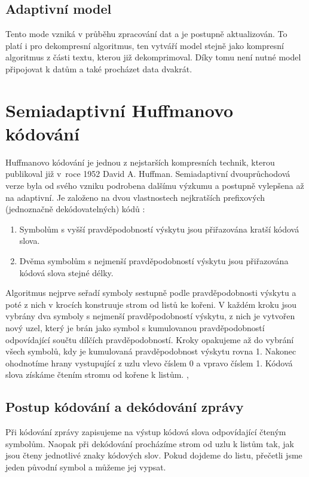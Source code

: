 \subsection{Adaptivní model}
Tento mode vzniká v průběhu zpracování dat a je postupně aktualizován. To platí i pro dekompresní algoritmus, ten vytváří model stejně jako kompresní algoritmus z části textu, kterou již dekomprimoval. Díky tomu není nutné model připojovat k datům a také procházet data dvakrát.

\section{Semiadaptivní Huffmanovo kódování}
\label{huffmanovoKodovani}
Huffmanovo kódování je jednou z nejstarších kompresních technik, kterou publikoval již v~roce 1952 David A. Huffman. Semiadaptivní dvouprůchodová verze byla od svého vzniku podrobena dalšímu výzkumu a postupně vylepšena až na adaptivní. Je založeno na dvou vlastnostech nejkratších prefixových (jednoznačně dekódovatelných) kódů \cite{introductionToDataCompression}:

\begin{enumerate}
\item Symbolům s vyšší pravděpodobností výskytu jsou přiřazována kratší kódová slova.
\item Dvěma symbolům s nejmenší pravděpodobností výskytu jsou přiřazována kódová slova stejné délky.
\end{enumerate}

Algoritmus nejprve seřadí symboly sestupně podle pravděpodobnosti výskytu a poté z nich v krocích konstruuje strom od listů ke kořeni. V každém kroku jsou vybrány dva symboly s nejmenší pravděpodobností výskytu, z nich je vytvořen nový uzel, který je brán jako symbol s kumulovanou pravděpodobností odpovídající součtu dílčích pravděpodobností. Kroky opakujeme až do vybrání všech symbolů, kdy je kumulovaná pravděpodobnost výskytu rovna 1. Nakonec ohodnotíme hrany vystupující z uzlu vlevo číslem 0 a vpravo číslem 1. Kódová slova získáme čtením stromu od kořene k listům. \cite{dataCompression}, \cite{introductionToDataCompression}

\subsection{Postup kódování a dekódování zprávy}
Při kódování zprávy zapisujeme na výstup kódová slova odpovídající čteným symbolům. Naopak při dekódování procházíme strom od uzlu k listům tak, jak jsou čteny jednotlivé znaky kódových slov. Pokud dojdeme do listu, přečetli jsme jeden původní symbol a můžeme jej vypsat.

